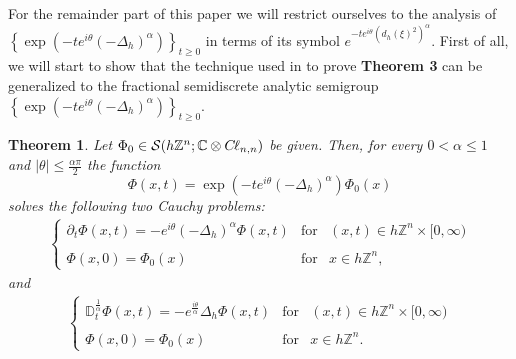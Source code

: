 \documentclass{elsarticle}
\newcommand{\BC}{{\mathbb C}}
\newcommand{\BZ}{{\mathbb Z}}
\newcommand{\cl}{C \kern -0.1em \ell}
\newtheorem{theorem}{Theorem}[section]
\begin{document}
For the remainder part of this paper we will restrict ourselves to the analysis of $\left\{\exp\left(-te^{i\theta}(-\Delta_h)^\alpha\right)\right\}_{t\geq 0}$ in terms of its symbol $e^{-te^{i\theta}(d_h(\xi)^2)^\alpha}$. 
First of all, we will start to show that the technique used in \cite{CLRV15} to prove {\bf Theorem 3} can be generalized to the fractional semidiscrete analytic semigroup $\left\{\exp\left(-te^{i\theta}(-\Delta_h)^\alpha\right)\right\}_{t\geq 0}$.
\begin{theorem}\label{SemigroupCauchySolver}
	Let $\Phi_0\in \mathcal{S}(h\BZ^n;\BC \otimes \cl_{n,n})$ be given. Then, 
	for every $0<\alpha\leq 1$ and $|\theta|\leq \frac{\alpha \pi}{2}$ the function 
	$$
	\Phi(x,t)=\exp(-te^{i\theta}(-\Delta_h)^\alpha)\Phi_0(x)
	$$
	solves the following two Cauchy problems:
	\begin{eqnarray}
		\label{CauchySemidiscrete} \left\{\begin{array}{lll} 
			\partial_t\Phi(x,t)= -e^{i\theta }(-\Delta_h)^\alpha \Phi(x,t) & \mbox{for} & (x,t)\in
			h\BZ^n \times [0,\infty)
			\\ \ \\
			\Phi(x,0)=\Phi_0(x) & \mbox{for} & x\in h\BZ^n,
		\end{array}\right.
	\end{eqnarray}
	and
	\begin{eqnarray}
		\label{CauchyTimeFractional} \left\{\begin{array}{lll} 
			\mathbb{D}_t^{\frac{1}{\alpha}}\Phi(x,t)= -e^{\frac{i\theta}{\alpha}}\Delta_h \Phi(x,t) & \mbox{for} & (x,t)\in
			h\BZ^n \times [0,\infty)
			\\ \ \\
			\Phi(x,0)=\Phi_0(x) & \mbox{for} & x\in h\BZ^n.
		\end{array}\right.
	\end{eqnarray}
\end{theorem}
\end{document}
